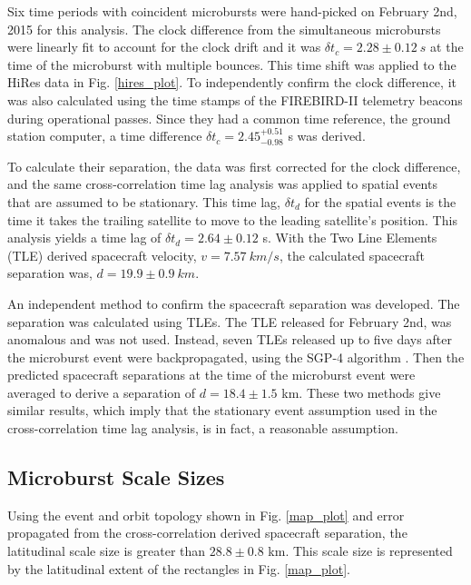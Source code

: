 \documentclass[draft,linenumbers]{agujournal}
\begin{document}
Six time periods with coincident microbursts were hand-picked on February 2nd, 2015 for this analysis. The clock difference from the simultaneous microbursts were linearly fit to account for the clock drift and it was $\delta t_{c} = 2.28 \pm 0.12 \ s$ at the time of the microburst with multiple bounces. This time shift was applied to the HiRes data in Fig. \ref{hires_plot}. To independently confirm the clock difference, it was also calculated using the time stamps of the FIREBIRD-II telemetry beacons during operational passes. Since they had a common time reference, the ground station computer, a time difference $\delta t_{c}  = 2.45^{+ 0.51}_{-0.98}$ s was derived. 

To calculate their separation, the data was first corrected for the clock difference, and the same cross-correlation time lag analysis was applied to spatial events that are assumed to be stationary. This time lag, $\delta t_{d}$ for the spatial events is the time it takes the trailing satellite to move to the leading satellite's position. This analysis yields a time lag of $\delta t_{d} = 2.64 \pm 0.12$ s.  With the Two Line Elements (TLE) derived spacecraft velocity, $v = 7.57 \ km/s$, the calculated spacecraft separation was, $d = 19.9 \pm 0.9 \ km $.

An independent method to confirm the spacecraft separation was developed. The separation was calculated using TLEs. The TLE released for February 2nd, was anomalous and was not used. Instead, seven TLEs released up to five days after the microburst event were backpropagated, using the SGP-4 algorithm \citep{sgp4}. Then the predicted spacecraft separations at the time of the microburst event were averaged to derive a separation of $d = 18.4 \pm 1.5$ km. These two methods give similar results, which imply that the stationary event assumption used in the cross-correlation time lag analysis, is in fact, a reasonable assumption.

\subsection{Microburst Scale Sizes} \label{scale_size} %
Using the event and orbit topology shown in Fig. \ref{map_plot} and error propagated from the cross-correlation derived spacecraft separation, the latitudinal scale size is greater than $ 28.8 \pm 0.8$ km. This scale size is represented by the latitudinal extent of the rectangles in Fig. \ref{map_plot}.
\end{document}
